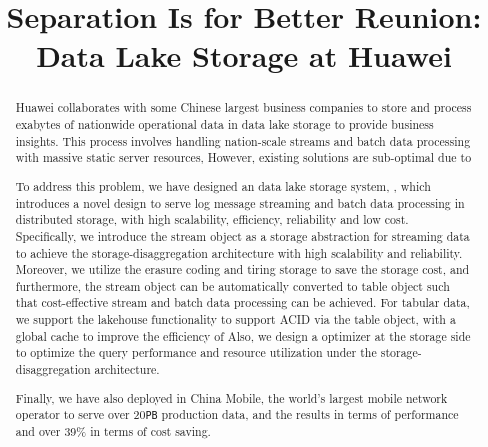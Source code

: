 \documentclass[sigconf, nonacm]{acmart}
\begin{document}
\title{Separation Is for Better Reunion: Data Lake Storage at Huawei}

\iffalse
\author{Ben Trovato}
\affiliation{%
  \institution{Institute for Clarity in Documentation}
  \streetaddress{P.O. Box 1212}
  \city{Dublin}
  \state{Ireland}
  \postcode{43017-6221}
}
\email{trovato@corporation.com}
\fi



\begin{abstract}
Huawei collaborates with some  Chinese largest business companies to store and process exabytes of nationwide operational data in data lake storage to provide business insights. This process involves handling nation-scale streams and batch data processing with massive static server resources, 
 However, existing solutions are sub-optimal due to 
 
 
 
 To address this problem, we have designed an  data lake storage system, \sys, which introduces a novel  design to serve log message streaming and batch data processing  in distributed storage, with high scalability, efficiency, reliability and low cost. Specifically, we introduce the stream object as a storage abstraction for streaming data to achieve the storage-disaggregation 
  architecture with high scalability and reliability. Moreover, we utilize the erasure coding and tiring storage to save the storage cost, and furthermore, the  stream object can be automatically converted to table object such that cost-effective stream and batch data processing can be achieved. For tabular data, we support the lakehouse functionality  to support ACID via the table object, with a global cache to improve the efficiency of   Also, we design a \brain optimizer at the storage side to optimize the query performance and resource utilization under the storage-disaggregation architecture.
 
  Finally, we have also deployed  \sys in China Mobile, the world's largest mobile network operator  to serve over 20\texttt{PB} production data, and the results  in terms of performance and over 39\% in terms of cost saving.
\end{abstract}
\end{document}
